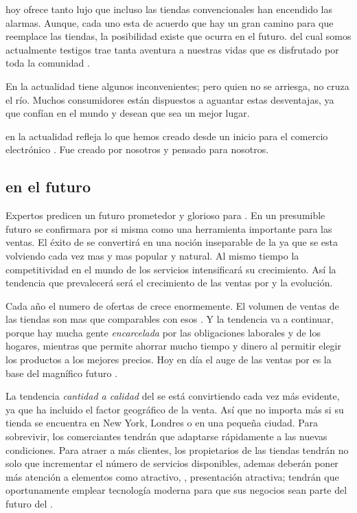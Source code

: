 \ecommerce hoy ofrece tanto lujo que incluso las tiendas convencionales han encendido las alarmas. Aunque, cada uno esta de acuerdo que hay un gran camino para que \ecommerce reemplace las tiendas, la posibilidad existe que ocurra en el futuro. \ecommerce del cual somos actualmente testigos trae tanta aventura a nuestras vidas que es disfrutado por toda la comunidad \online.

En la actualidad \ecommerce tiene algunos inconvenientes; pero quien no se arriesga, no cruza el río. Muchos consumidores están dispuestos a aguantar estas desventajas, ya que confían en el mundo \online y desean que sea un mejor lugar.

\ecommerce en la actualidad refleja lo que hemos creado desde un inicio para el comercio electrónico \online. Fue creado por nosotros y pensado para nosotros.

\subsection{\ecommerce en el futuro}

Expertos predicen un futuro prometedor y glorioso para \ecommerce. En un presumible futuro \ecommerce se confirmara por si misma como una herramienta importante para las ventas. El éxito de \ecommerce se convertirá en una noción inseparable de la \web ya que \eshopping se esta volviendo cada vez mas y mas popular y natural. Al mismo tiempo la competitividad en el mundo de los servicios \ecommerce intensificará su crecimiento. Así la tendencia que  prevalecerá \ecommerce será el crecimiento de las ventas por \internet y la evolución.

Cada año el numero de ofertas de \ecommerce crece enormemente. El volumen de ventas de las tiendas \online  son mas que comparables con esos \brickandmortar. Y la tendencia va a continuar, porque hay mucha gente \textit{encarcelada} por las obligaciones laborales y de los hogares, mientras que \internet permite ahorrar mucho tiempo y dinero al permitir  elegir los productos a los mejores precios. Hoy en día el auge de las ventas por \internet es la base del magnífico futuro \ecommerce.

La tendencia \textit{cantidad a calidad} del \ecommerce se está convirtiendo cada vez más evidente, ya que \internet ha incluido el factor geográfico de la venta. Así que no importa más si su tienda se encuentra en New York, Londres o en una pequeña ciudad. Para sobrevivir, los comerciantes tendrán que adaptarse rápidamente a las nuevas condiciones. Para atraer a más clientes, los propietarios de las tiendas \online tendrán no solo que incrementar el número de servicios disponibles, ademas deberán poner más atención a elementos como \design atractivo, \userfriendliness, presentación atractiva; tendrán que oportunamente emplear tecnología moderna para que sus negocios sean parte del futuro del \ecommerce.

